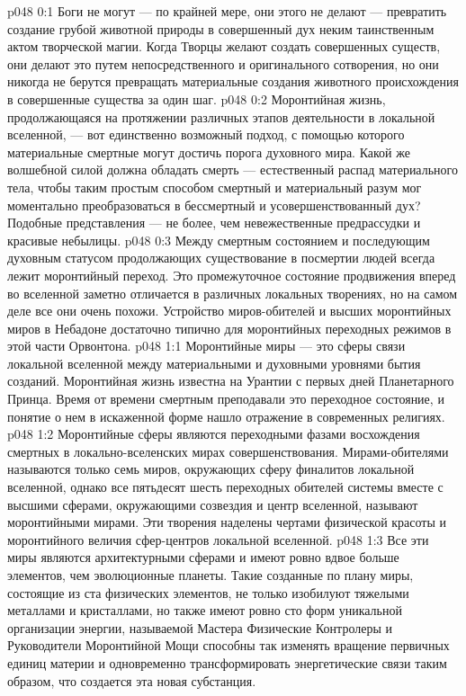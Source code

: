 \author{Архангел}
\vs p048 0:1 Боги не могут --- по крайней мере, они этого не делают --- превратить создание грубой животной природы в совершенный дух неким таинственным актом творческой магии. Когда Творцы желают создать совершенных существ, они делают это путем непосредственного и оригинального сотворения, но они никогда не берутся превращать материальные создания животного происхождения в совершенные существа за один шаг.
\vs p048 0:2 Моронтийная жизнь, продолжающаяся на протяжении различных этапов деятельности в локальной вселенной, --- вот единственно возможный подход, с помощью которого материальные смертные могут достичь порога духовного мира. Какой же волшебной силой должна обладать смерть --- естественный распад материального тела, чтобы таким простым способом смертный и материальный разум мог моментально преобразоваться в бессмертный и усовершенствованный дух? Подобные представления --- не более, чем невежественные предрассудки и красивые небылицы.
\vs p048 0:3 Между смертным состоянием и последующим духовным статусом продолжающих существование в посмертии людей всегда лежит моронтийный переход. Это промежуточное состояние продвижения вперед во вселенной заметно отличается в различных локальных творениях, но на самом деле все они очень похожи. Устройство миров\hyp{}обителей и высших моронтийных миров в Небадоне достаточно типично для моронтийных переходных режимов в этой части Орвонтона.
\vs p048 1:1 Моронтийные миры --- это сферы связи локальной вселенной между материальными и духовными уровнями бытия созданий. Моронтийная жизнь известна на Урантии с первых дней Планетарного Принца. Время от времени смертным преподавали это переходное состояние, и понятие о нем в искаженной форме нашло отражение в современных религиях.
\vs p048 1:2 Моронтийные сферы являются переходными фазами восхождения смертных в локально\hyp{}вселенских мирах совершенствования. Мирами\hyp{}обителями называются только семь миров, окружающих сферу финалитов локальной вселенной, однако все пятьдесят шесть переходных обителей системы вместе с высшими сферами, окружающими созвездия и центр вселенной, называют моронтийными мирами. Эти творения наделены чертами физической красоты и моронтийного величия сфер\hyp{}центров локальной вселенной.
\vs p048 1:3 Все эти миры являются архитектурными сферами и имеют ровно вдвое больше элементов, чем эволюционные планеты. Такие созданные по плану миры, состоящие из ста физических элементов, не только изобилуют тяжелыми металлами и кристаллами, но также имеют ровно сто форм уникальной организации энергии, называемой  Мастера Физические Контролеры и Руководители Моронтийной Мощи способны так изменять вращение первичных единиц материи и одновременно трансформировать энергетические связи таким образом, что создается эта новая субстанция.
